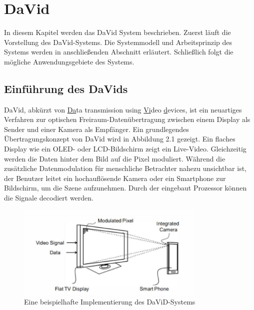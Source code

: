 \chapter{DaVid} \label{cha:DaVid}

In diesem Kapitel werden das DaVid System beschrieben. Zuerst läuft die Vorstellung des DaVid-Systems. Die Systemmodell und Arbeitsprinzip des Systems werden in anschließenden Abschnitt erläutert. Schließlich folgt die mögliche Anwendungsgebiete des Systems.

\section{Einführung des DaVids} 

DaVid, abkürzt von \uline{Da}ta transmission using \uline{Vi}deo \uline{d}evices, ist ein neuartiges Verfahren zur optischen Freiraum-Datenübertragung zwischen einem Display als Sender und einer Kamera als Empfänger. Ein grundlegendes Übertragungskonzept von DaVid wird in Abbildung 2.1 gezeigt. Ein flaches Display wie ein OLED- oder LCD-Bildschirm zeigt ein Live-Video. Gleichzeitig werden die Daten hinter dem Bild auf die Pixel moduliert. Während die zusätzliche Datenmodulation für menschliche Betrachter nahezu unsichtbar ist, der Benutzer leitet ein hochauflösende Kamera oder ein Smartphone zur Bildschirm, um die Szene aufzunehmen. Durch der eingebaut Prozessor können die Signale decodiert werden.

\begin{figure}[htb]
 \centering 
 \includegraphics[keepaspectratio,width=0.8\textwidth]{images/David1.jpg}
 \caption{Eine beispielhafte Implementierung des DaViD-Systems}
 \label{fig:David1}
\end{figure}



